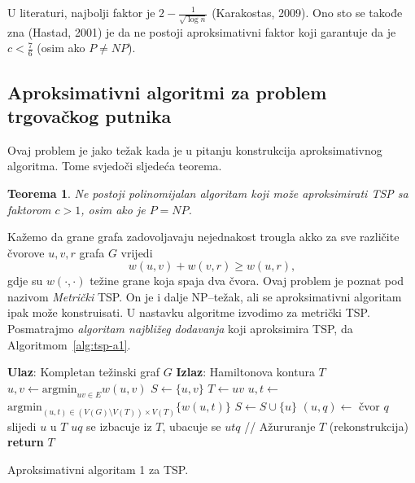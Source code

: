 \documentclass[a4paper, utf8, 11pt, colorlinks]{book}
\newtheorem{thm}{Teorema}
\begin{document}
  \noindent U literaturi, najbolji faktor je $2 - \frac{1}{\sqrt{\log n}}$ (Karakostas, 2009).
  Ono sto se takođe zna (Hastad, 2001) je da ne postoji aproksimativni faktor 
  koji garantuje da je $c < \frac{7}{6}$ (osim ako $P \neq NP$). 
  
  \subsection{Aproksimativni algoritmi za problem trgovačkog putnika}
  
  Ovaj problem je jako težak kada je u pitanju konstrukcija aproksimativnog algoritma. Tome svjedoči sljedeća teorema.
 \begin{thm}
    Ne postoji polinomijalan algoritam koji može aproksimirati TSP sa  faktorom $c > 1$, osim ako je $P = NP$. 
\end{thm}
  Kažemo da grane grafa zadovoljavaju nejednakost trougla akko za sve različite čvorove $u,v, r$ grafa $G$ vrijedi
  $$ w(u,v) + w(v,r) \geq w(u,r),$$
  gdje su $w(\cdot, \cdot)$ težine grane koja spaja dva čvora. Ovaj problem je poznat 
  pod nazivom \emph{Metrički} TSP. On je i dalje NP--težak, ali se aproksimativni algoritam ipak može konstruisati.  U nastavku algoritme izvodimo za metrički  TSP. Posmatrajmo \emph{algoritam najbližeg dodavanja} koji aproksimira TSP, da Algoritmom~\ref{alg:tsp-a1}. 
  
   \begin{algorithm}[!t] 
  
  	\begin{algorithmic}[1]
  		\STATE \textbf{Ulaz}: Kompletan težinski graf $G$
  		\STATE \textbf{Izlaz}: Hamiltonova kontura $T$  
  		\STATE $u,v \gets \mbox{argmin}_{uv \in E} w(u,v)$
  		\STATE $S \gets \{u,v\}$
  		\STATE $T \gets uv$
  		\STATE $u,t \gets$ $\mbox{argmin}_{(u,t) \in (V(G)\setminus V(T)) \times V(T)} \{w(u, t)\}$
  		\STATE $ S \gets S \cup \{u\}$ 
  		\STATE $(u, q)\gets$ čvor $q$ slijedi $u$ u  $T$
  		\STATE  $uq$ se izbacuje iz $T$, ubacuje se $utq$  // Ažururanje $T$ (rekonstrukcija)
  		\ENDWHILE
  		\STATE \textbf{return} $T$
  	\end{algorithmic}
   	\caption{Aproksimativni algoritam 1 za TSP.}
   	\label{alg:tsp-a1}
  \end{algorithm}
\end{document}

